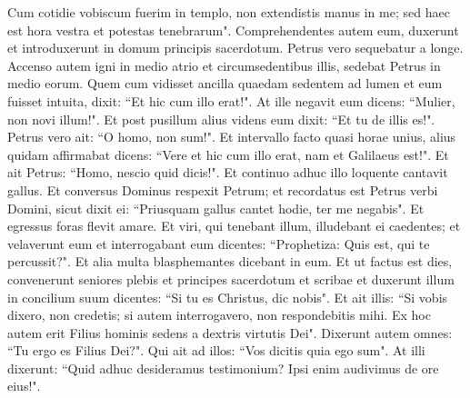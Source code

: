 \begin{biblechapter}
\verse Cum cotidie vobiscum fuerim in templo, non extendistis manus in me; sed haec est hora vestra et potestas tenebrarum". 
\verse Comprehendentes autem eum, duxerunt et introduxerunt in domum principis sacerdotum. Petrus vero sequebatur a longe. 
\verse Accenso autem igni in medio atrio et circumsedentibus illis, sedebat Petrus in medio eorum. 
\verse Quem cum vidisset ancilla quaedam sedentem ad lumen et eum fuisset intuita, dixit: 
\verse “Et hic cum illo erat!". At ille negavit eum dicens: 
\verse “Mulier, non novi illum!". Et post pusillum alius videns eum dixit: “Et tu de illis es!". Petrus vero ait: “O homo, non sum!". 
\verse Et intervallo facto quasi horae unius, alius quidam affirmabat dicens: “Vere et hic cum illo erat, nam et Galilaeus est!". 
\verse Et ait Petrus: “Homo, nescio quid dicis!". Et continuo adhuc illo loquente cantavit gallus. 
\verse Et conversus Dominus respexit Petrum; et recordatus est Petrus verbi Domini, sicut dixit ei: “Priusquam gallus cantet hodie, ter me negabis". 
\verse Et egressus foras flevit amare. 
\verse Et viri, qui tenebant illum, illudebant ei caedentes; 
\verse et velaverunt eum et interrogabant eum dicentes: “Prophetiza: Quis est, qui te percussit?".  
\verse Et alia multa blasphemantes dicebant in eum. 
\verse Et ut factus est dies, convenerunt seniores plebis et principes sacerdotum et scribae et duxerunt illum in concilium suum 
\verse dicentes: “Si tu es Christus, dic nobis". Et ait illis: “Si vobis dixero, non credetis; 
\verse si autem interrogavero, non respondebitis mihi. 
\verse Ex hoc autem erit Filius hominis sedens a dextris virtutis Dei". 
\verse Dixerunt autem omnes: “Tu ergo es Filius Dei?". Qui ait ad illos: “Vos dicitis quia ego sum". 
\verse At illi dixerunt: “Quid adhuc desideramus testimonium? Ipsi enim audivimus de ore eius!". 
\end{biblechapter}

